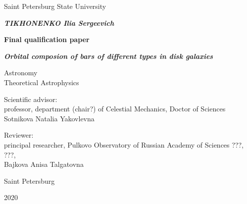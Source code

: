 \begin{titlepage}
  \centering
  {Saint Petersburg State University \par}
  
  \vspace{1.5cm}

  {\bfseries \itshape\MakeUppercase{Tikhonenko} Ilia Sergeevich\par}
  \vspace{0.5\baselineskip}
  {\bfseries Final qualification paper\par}
  \vspace{0.5\baselineskip}
  {\bfseries \itshape Orbital composion of bars of different types in disk galaxies\par}
  \vspace{1cm}
  {
    ${}$\\ 
    ${}$\\
    Astronomy\\
    Theoretical Astrophysics
  }
  \vspace{1cm}
  \begin{flushright}
    \parbox{0.5\textwidth}{
      {Scientific advisor:} \\
      professor, department (chair?) of Celestial Mechanics, Doctor of Sciences\\
      Sotnikova Natalia Yakovlevna
    }
  \end{flushright}
  \par
  \begin{flushright}
    \parbox{0.5\textwidth}{
      {Reviewer:} \\
      principal researcher, Pulkovo Observatory of Russian Academy of Sciences
      ???, ???,\\
      Bajkova Anisa Talgatovna
    }
  \end{flushright}
  
  \vfill
  
  {Saint Petersburg \par}
  {2020}
\end{titlepage}
